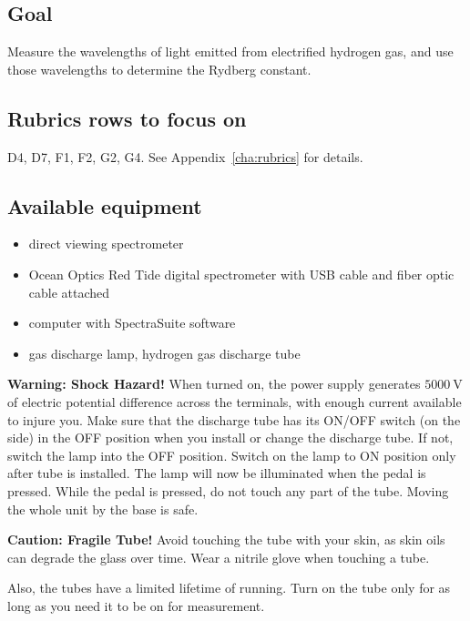 \subsection{Goal}

Measure the wavelengths of light emitted from electrified hydrogen gas, and use those wavelengths to determine the Rydberg constant.

\subsection{Rubrics rows to focus on}

D4, D7, F1, F2, G2, G4. See Appendix~\ref{cha:rubrics} for details.

\subsection{Available equipment}

\begin{itemize}
	\item direct viewing spectrometer
	
	\item Ocean Optics Red Tide digital spectrometer with USB cable and fiber optic cable attached
	
	\item computer with SpectraSuite software
	
	\item gas discharge lamp, hydrogen gas discharge tube
\end{itemize}


\begin{framed}
 \textbf{Warning: Shock Hazard!} When turned on, the power supply generates $5000\:$V of electric potential difference across the terminals, with enough current available to injure you. Make sure that the discharge tube has its ON/OFF switch (on the side) in the
 OFF position when you install or change the discharge tube. If not, switch the lamp into
 the OFF position. Switch on the lamp to ON position only after tube is installed. The
 lamp will now be illuminated when the pedal is pressed. While the pedal is pressed, do not touch any part of the tube. Moving the
 whole unit by the base is safe.
\end{framed}

\begin{framed}
	\textbf{Caution: Fragile Tube!} Avoid touching the tube with your skin, as skin oils can degrade the glass over time. Wear a nitrile glove when touching a tube.
	
	Also, the tubes have a limited lifetime of running. Turn on the tube only for as long as you need it to be on for measurement.
\end{framed}

